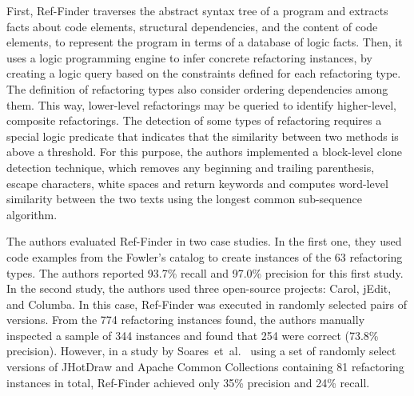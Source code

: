 First, Ref-Finder traverses the abstract syntax tree of a program and extracts facts about code elements, structural dependencies, and the content of code elements, to represent the program in terms of a database of logic facts. Then, it uses a logic programming engine to infer concrete refactoring instances, by creating a logic query based on the constraints defined for each refactoring type.
The definition of refactoring types also consider ordering dependencies among them. This way, lower-level refactorings may be queried to identify higher-level, composite refactorings.
The detection of some types of refactoring requires a special logic predicate that indicates that the similarity between two methods is above a threshold. For this purpose, the authors implemented a block-level clone detection technique, which removes any beginning and trailing parenthesis, escape characters, white spaces and return keywords and computes word-level similarity between the two texts using the longest common sub-sequence algorithm.

The authors evaluated Ref-Finder in two case studies.
In the first one, they used code examples from the Fowler's catalog to create instances of the 63 refactoring types. The authors reported 93.7\% recall and 97.0\% precision for this first study.
In the second study, the authors used three open-source projects: Carol, jEdit, and Columba. In this case, Ref-Finder was executed in randomly selected pairs of versions. From the 774 refactoring instances found, the authors manually inspected a sample of 344 instances and found that 254 were correct (73.8\% precision).
However, in a study by Soares~et~al.~\cite{Soares:2013} using a set of randomly select versions of JHotDraw and Apache Common Collections containing 81 refactoring instances in total, Ref-Finder achieved only 35\% precision and 24\% recall.
